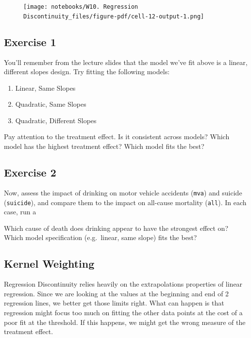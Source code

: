 \documentclass[
  letterpaper,
  DIV=11,
  numbers=noendperiod]{scrreprt}
\providecommand{\tightlist}{%
  \setlength{\itemsep}{0pt}\setlength{\parskip}{0pt}}\usepackage{longtable,booktabs,array}
\begin{document}
\begin{figure}[H]

{\centering \texttt{[image: notebooks/W10. Regression Discontinuity\_files/figure-pdf/cell-12-output-1.png]}

}

\end{figure}

\hypertarget{exercise-1-1}{%
\subsection{Exercise 1}\label{exercise-1-1}}

You'll remember from the lecture slides that the model we've fit above
is a linear, different slopes design. Try fitting the following models:

\begin{enumerate}
\def\labelenumi{\arabic{enumi}.}
\tightlist
\item
  Linear, Same Slopes
\item
  Quadratic, Same Slopes
\item
  Quadratic, Different Slopes
\end{enumerate}

Pay attention to the treatment effect. Is it consistent across models?
Which model has the highest treatment effect? Which model fits the best?

\hypertarget{exercise-2-1}{%
\subsection{Exercise 2}\label{exercise-2-1}}

Now, assess the impact of drinking on motor vehicle accidents
(\texttt{mva}) and suicide (\texttt{suicide}), and compare them to the
impact on all-cause mortality (\texttt{all}). In each case, run a

Which cause of death does drinking appear to have the strongest effect
on? Which model specification (e.g.~linear, same slope) fits the best?

\hypertarget{kernel-weighting}{%
\subsection{Kernel Weighting}\label{kernel-weighting}}

Regression Discontinuity relies heavily on the extrapolations properties
of linear regression. Since we are looking at the values at the
beginning and end of 2 regression lines, we better get those limits
right. What can happen is that regression might focus too much on
fitting the other data points at the cost of a poor fit at the
threshold. If this happens, we might get the wrong measure of the
treatment effect.
\end{document}
